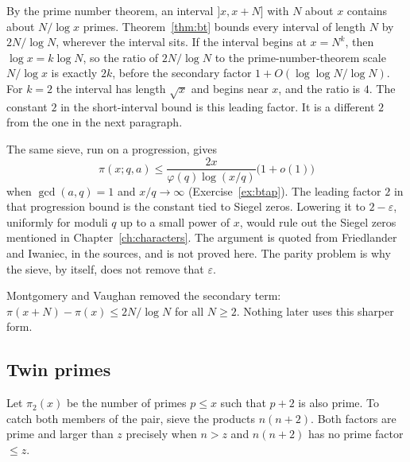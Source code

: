 By the prime number theorem, an interval $]x,x+N]$ with $N$ about $x$ contains about $N/\log x$ primes. Theorem~\ref{thm:bt} bounds every interval of length $N$ by $2N/\log N$, wherever the interval sits. If the interval begins at $x=N^k$, then $\log x=k\log N$, so the ratio of $2N/\log N$ to the prime-number-theorem scale $N/\log x$ is exactly $2k$, before the secondary factor $1+O(\log\log N/\log N)$. For $k=2$ the interval has length $\sqrt x$ and begins near $x$, and the ratio is $4$. The constant $2$ in the short-interval bound is this leading factor. It is a different $2$ from the one in the next paragraph.

The same sieve, run on a progression, gives
\[
\pi(x;q,a)\le\frac{2x}{\varphi(q)\log(x/q)}\bigl(1+o(1)\bigr)
\]
when $\gcd(a,q)=1$ and $x/q\to\infty$ (Exercise~\ref{ex:btap}). The leading factor $2$ in that progression bound is the constant tied to Siegel zeros. Lowering it to $2-\varepsilon$, uniformly for moduli $q$ up to a small power of $x$, would rule out the Siegel zeros mentioned in Chapter~\ref{ch:characters}. The argument is quoted from Friedlander and Iwaniec, in the sources, and is not proved here. The parity problem is why the sieve, by itself, does not remove that $\varepsilon$.

\begin{remark}
Montgomery and Vaughan removed the secondary term: $\pi(x+N)-\pi(x)\le 2N/\log N$ for all $N\ge2$. Nothing later uses this sharper form.
\end{remark}

\subsection*{Twin primes}

Let $\pi_2(x)$ be the number of primes $p\le x$ such that $p+2$ is also prime. To catch both members of the pair, sieve the products $n(n+2)$. Both factors are prime and larger than $z$ precisely when $n>z$ and $n(n+2)$ has no prime factor $\le z$.

